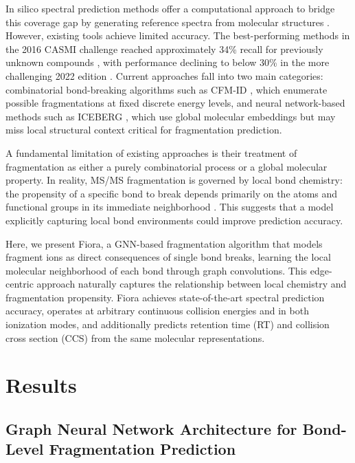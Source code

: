 \documentclass[11pt]{article}
\begin{document}
In silico spectral prediction methods offer a computational approach to bridge this coverage gap by generating reference spectra from molecular structures \citep{Allen2015,Wolf2010}. However, existing tools achieve limited accuracy. The best-performing methods in the 2016 CASMI challenge reached approximately 34\% recall for previously unknown compounds \citep{Schymanski2017}, with performance declining to below 30\% in the more challenging 2022 edition \citep{Nothias2022}. Current approaches fall into two main categories: combinatorial bond-breaking algorithms such as CFM-ID \citep{Allen2015,Wang2021}, which enumerate possible fragmentations at fixed discrete energy levels, and neural network-based methods such as ICEBERG \citep{Goldman2023}, which use global molecular embeddings but may miss local structural context critical for fragmentation prediction.

A fundamental limitation of existing approaches is their treatment of fragmentation as either a purely combinatorial process or a global molecular property. In reality, MS/MS fragmentation is governed by local bond chemistry: the propensity of a specific bond to break depends primarily on the atoms and functional groups in its immediate neighborhood \citep{Allen2015,Duhrkop2015}. This suggests that a model explicitly capturing local bond environments could improve prediction accuracy.

Here, we present Fiora, a GNN-based fragmentation algorithm that models fragment ions as direct consequences of single bond breaks, learning the local molecular neighborhood of each bond through graph convolutions. This edge-centric approach naturally captures the relationship between local chemistry and fragmentation propensity. Fiora achieves state-of-the-art spectral prediction accuracy, operates at arbitrary continuous collision energies and in both ionization modes, and additionally predicts retention time (RT) and collision cross section (CCS) from the same molecular representations.

\section{Results}

\subsection{Graph Neural Network Architecture for Bond-Level Fragmentation Prediction}
\end{document}
